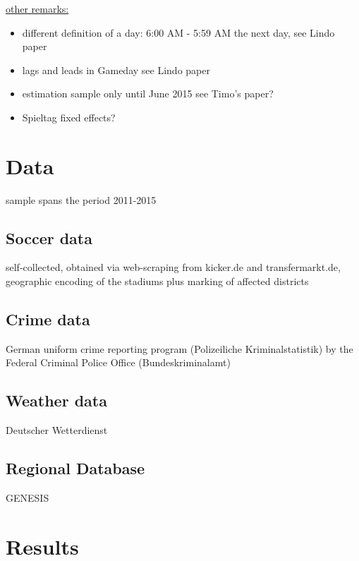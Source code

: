 \documentclass[11pt, a4paper]{article} %
\begin{document}
\underline{other remarks:}
\begin{itemize}
	\item different definition of a day: 6:00 AM - 5:59 AM the next day, see Lindo paper
	\item lags and leads in Gameday see Lindo paper
	\item estimation sample only until June 2015 see Timo's paper?
	\item Spieltag fixed effects?
\end{itemize}



\newpage
\section{Data}\label{sec_soc_ext:data} 

sample spans the period 2011-2015

\subsection{Soccer data}
self-collected, obtained via web-scraping from kicker.de and transfermarkt.de, geographic encoding of the stadiums plus marking of affected districts

\subsection{Crime data}
German uniform crime reporting program (Polizeiliche Kriminalstatistik) by the Federal Criminal Police Office (Bundeskriminalamt)

\subsection{Weather data}
Deutscher Wetterdienst

\subsection{Regional Database}
GENESIS





\newpage
\section{Results}\label{sec_soc_ext:results}
\end{document}
